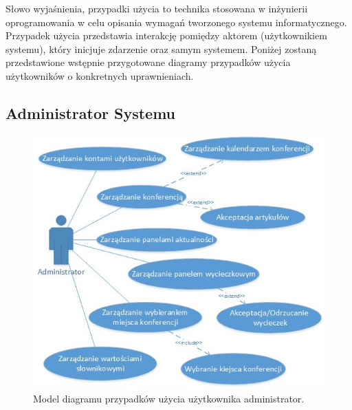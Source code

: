 Słowo wyjaśnienia, przypadki użycia to technika stosowana w inżynierii oprogramowania w celu opisania wymagań tworzonego systemu informatycznego. Przypadek użycia przedstawia interakcję pomiędzy aktorem (użytkownikiem systemu), który inicjuje zdarzenie oraz samym systemem.\newline
Poniżej zostaną przedstawione wstępnie przygotowane diagramy przypadków użycia użytkowników o konkretnych uprawnieniach.

\subsection{Administrator Systemu}

\begin{figure}[!tb]
    \centering
    \includegraphics{administrator.jpg}
    \caption{Model diagramu przypadków użycia użytkownika administrator.}
    \label{fig:administrator}
\end{figure}

